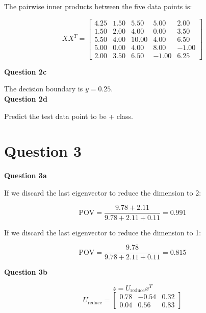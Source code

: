 \documentclass[11pt,a4paper]{report}
\begin{document}
\begin{multicols*}{2}
\noindent The pairwise inner products between the five data points is:

$$X X^{T} =
\begin{bmatrix}
4.25 & 1.50 &  5.50 &  5.00  &  2.00\\
1.50 & 2.00 &  4.00 &  0.00  &  3.50\\
5.50 & 4.00 & 10.00 &  4.00  &  6.50\\
5.00 & 0.00 &  4.00 &  8.00  & -1.00\\
2.00 & 3.50 &  6.50 & -1.00  &  6.25
\end{bmatrix}$$

\noindent \textbf{Question 2c}


\noindent The decision boundary is $y=0.25$.\\

\noindent \textbf{Question 2d}

\noindent Predict the test data point to be + class.

\section{Question 3}

\noindent \textbf{Question 3a}

\noindent If we discard the last eigenvector to reduce the dimension to 2:

$$\text{POV} = \frac{9.78 + 2.11}{9.78 + 2.11 + 0.11} = 0.991$$

\noindent If we discard the last eigenvector to reduce the dimension to 1:

$$\text{POV} = \frac{9.78}{9.78 + 2.11 + 0.11} = 0.815$$

\noindent \textbf{Question 3b}

$$z = U_{\text{reduce}} x^{T}$$
$$U_{\text{reduce}} = \begin{bmatrix}
0.78 & -0.54 & 0.32 \\
0.04 & 0.56 & 0.83
\end{bmatrix}$$


\end{multicols*}
\end{document}
